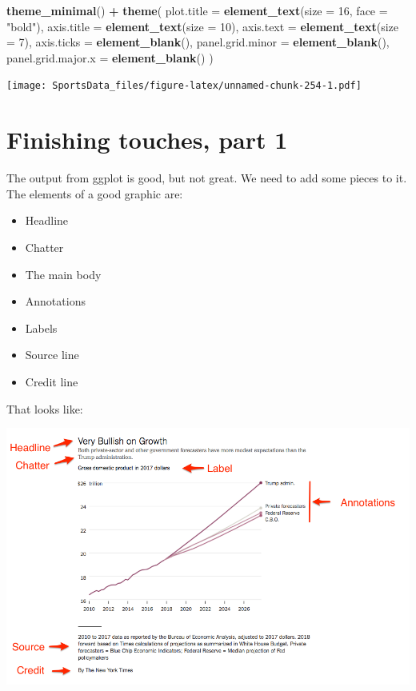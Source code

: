 \documentclass[]{book}
\newenvironment{Shaded}{\begin{snugshade}}{\end{snugshade}}
\newcommand{\DataTypeTok}[1]{\textcolor[rgb]{0.13,0.29,0.53}{#1}}
\newcommand{\DecValTok}[1]{\textcolor[rgb]{0.00,0.00,0.81}{#1}}
\newcommand{\KeywordTok}[1]{\textcolor[rgb]{0.13,0.29,0.53}{\textbf{#1}}}
\newcommand{\NormalTok}[1]{#1}
\newcommand{\OperatorTok}[1]{\textcolor[rgb]{0.81,0.36,0.00}{\textbf{#1}}}
\newcommand{\StringTok}[1]{\textcolor[rgb]{0.31,0.60,0.02}{#1}}
\providecommand{\tightlist}{%
  \setlength{\itemsep}{0pt}\setlength{\parskip}{0pt}}
\begin{document}
\begin{Shaded}
\begin{Highlighting}[]
\StringTok{  }\KeywordTok{theme_minimal}\NormalTok{() }\OperatorTok{+}\StringTok{ }
\StringTok{  }\KeywordTok{theme}\NormalTok{(}
    \DataTypeTok{plot.title =} \KeywordTok{element_text}\NormalTok{(}\DataTypeTok{size =} \DecValTok{16}\NormalTok{, }\DataTypeTok{face =} \StringTok{"bold"}\NormalTok{),}
    \DataTypeTok{axis.title =} \KeywordTok{element_text}\NormalTok{(}\DataTypeTok{size =} \DecValTok{10}\NormalTok{),}
    \DataTypeTok{axis.text =} \KeywordTok{element_text}\NormalTok{(}\DataTypeTok{size =} \DecValTok{7}\NormalTok{),}
    \DataTypeTok{axis.ticks =} \KeywordTok{element_blank}\NormalTok{(),}
    \DataTypeTok{panel.grid.minor =} \KeywordTok{element_blank}\NormalTok{(),}
    \DataTypeTok{panel.grid.major.x =} \KeywordTok{element_blank}\NormalTok{()}
\NormalTok{  )}
\end{Highlighting}
\end{Shaded}

\texttt{[image: SportsData\_files/figure-latex/unnamed-chunk-254-1.pdf]}

\hypertarget{finishing-touches-part-1}{%
\chapter{Finishing touches, part 1}\label{finishing-touches-part-1}}

The output from ggplot is good, but not great. We need to add some pieces to it. The elements of a good graphic are:

\begin{itemize}
\tightlist
\item
  Headline
\item
  Chatter
\item
  The main body
\item
  Annotations
\item
  Labels
\item
  Source line
\item
  Credit line
\end{itemize}

That looks like:

\includegraphics[width=12.97in]{images/chartannotated}
\end{document}
